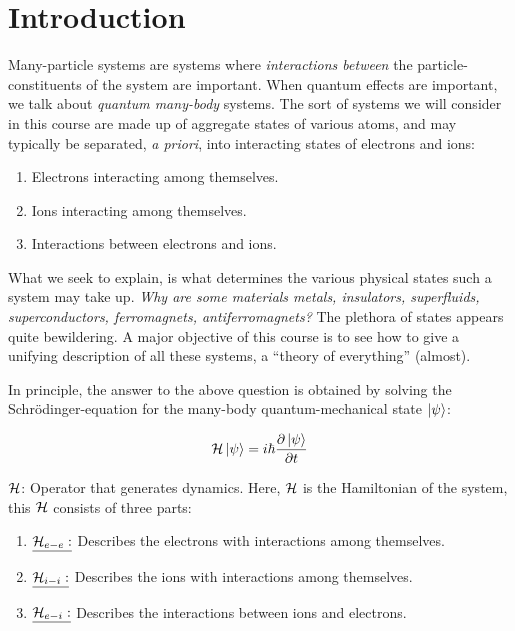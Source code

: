 \chapter{Introduction} 

\noindent Many-particle systems are systems where \emph{interactions between} the particle-constituents of the system are important. When quantum effects are important, we talk about \emph{quantum many-body} systems. The sort of systems we will consider in this course are made up of aggregate states of various atoms, and may typically be separated, \emph{a priori}, into interacting states of electrons and ions:

\begin{enumerate}
	\item
		Electrons interacting among themselves.
	\item 
		Ions interacting among themselves.
	\item
		Interactions between electrons and ions.
\end{enumerate}

\noindent What we seek to explain, is what determines the various physical states such a system may take up. \emph{Why are some materials metals, insulators, superfluids, superconductors, ferromagnets, antiferromagnets?} The plethora of states appears quite bewildering. A major objective of this course is to see how to give a unifying description of all these systems, a ``theory of everything'' (almost).

In principle, the answer to the above question is obtained by solving the Schrödinger-equation for the many-body quantum-mechanical state $\ket{\psi}$:

\begin{equation}
	\mathcal{H} \ket{\psi} = i \hbar \frac{\partial \ket{\psi}}{\partial t}
\end{equation}

\noindent $\mathcal{H}$: Operator that generates dynamics. Here, $\mathcal{H}$ is the Hamiltonian of the system, this $\mathcal{H}$ consists of three parts:

\begin{enumerate}
	\item
		$\emph{\mathcal{H}_{e-e}:}$ Describes the electrons with interactions among themselves.
	\item
		$\emph{\mathcal{H}_{i-i}:}$ Describes the ions with interactions among themselves.
	\item
		$\emph{\mathcal{H}_{e-i}:}$ Describes the interactions between ions and electrons.
\end{enumerate}

